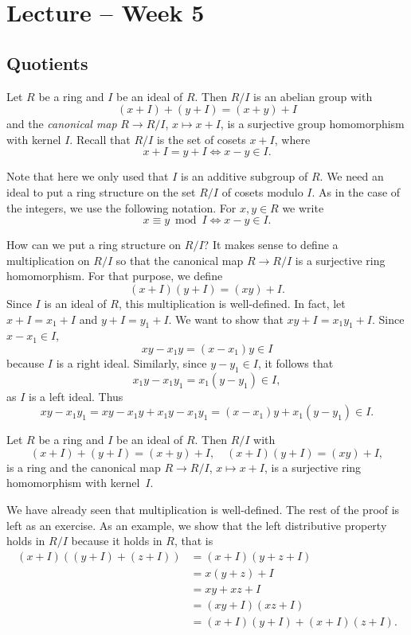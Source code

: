 \section{Lecture -- Week 5}

\subsection{Quotients}

Let $R$ be a ring and $I$ be an ideal of $R$. 
Then $R/I$ is an abelian group
with 
\[
(x+I)+(y+I)=(x+y)+I
\]
and the 
\emph{canonical map} 
$R\to R/I$, $x\mapsto x+I$,
is a surjective group homomorphism with kernel $I$. Recall that 
$R/I$ is the set of cosets $x+I$, where 
\[
x+I=y+I\Longleftrightarrow x-y\in I.
\]

Note that here we only used
that $I$ is an additive subgroup of $R$. We need an ideal to put a ring structure
on the set $R/I$ of cosets modulo $I$. As in the case of the integers, 
we use the following notation. For $x,y\in R$ 
we write 
\[
x\equiv y\bmod I\Longleftrightarrow x-y\in I.
\]

How can we put a ring structure on $R/I$? It makes sense
to define a multiplication on $R/I$ so that
the canonical map $R\to R/I$ is a surjective ring homomorphism. For that purpose, 
we define 
\[
(x+I)(y+I)=(xy)+I.
\]
Since $I$ is an ideal of $R$, this multiplication is well-defined. In fact, let 
$x+I=x_1+I$ and $y+I=y_1+I$. We want to show that
$xy+I=x_1y_1+I$. Since $x-x_1\in I$, 
\[
xy-x_1y=(x-x_1)y\in I
\]
because $I$ is a right ideal. Similarly, since $y-y_1\in I$, it follows that 
\[
x_1y-x_1y_1=x_1(y-y_1)\in I,
\]
as $I$ is a left ideal. Thus
\[
xy-x_1y_1=xy-x_1y+x_1y-x_1y_1=(x-x_1)y+x_1(y-y_1)\in I.
\]

\begin{theorem}
\label{thm:quotient_ring}
	Let $R$ be a ring and $I$ be an ideal of $R$. Then
	$R/I$ with 
	\[
	(x+I)+(y+I)=(x+y)+I,\quad
	(x+I)(y+I)=(xy)+I,
	\]
	is a ring and the canonical map $R\to R/I$, $x\mapsto x+I$, 
	is a surjective ring homomorphism with kernel~$I$. 
\end{theorem}

We have already seen that multiplication is well-defined. 
The rest of the proof is left as an exercise. As an example, we show that 
the left distributive property holds
in $R/I$ because it holds in $R$, that is 
\begin{align*}
    (x+I)\left((y+I)+(z+I)\right) &= (x+I)(y+z+I)\\
    &=x(y+z)+I\\
    &=xy+xz+I\\
    &=(xy+I)(xz+I)\\
    &=(x+I)(y+I)+(x+I)(z+I).
\end{align*}

